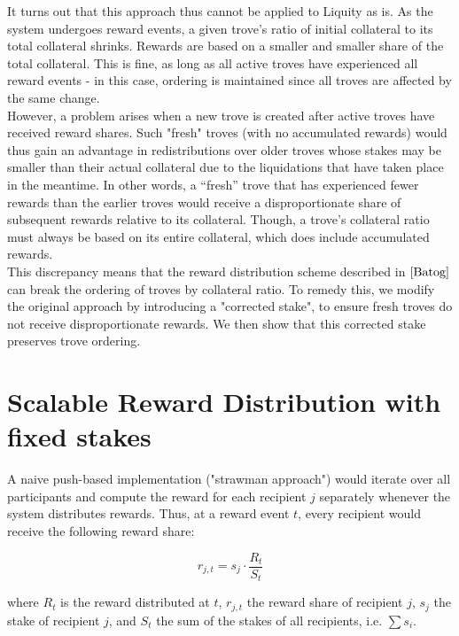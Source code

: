 \documentclass[reqno]{article}
\begin{document}
It turns out that this approach thus cannot be applied to Liquity as is. As the system undergoes reward events, a given trove’s ratio of initial collateral to its total collateral shrinks. Rewards are based on a smaller and smaller share of the total collateral. This is fine, as long as all active troves have experienced all reward events - in this case, ordering is maintained since all troves are affected by the same change. \\

However, a problem arises when a new trove is created after active troves have received reward shares.  Such "fresh" troves (with no accumulated rewards) would thus gain an advantage in redistributions over older troves whose stakes may be smaller than their actual collateral due to the liquidations that have taken place in the meantime. In other words, a “fresh” trove that has experienced fewer rewards than the earlier troves would receive a disproportionate share of subsequent rewards relative to its collateral. Though, a trove's collateral ratio must always be based on its entire collateral, which does include accumulated rewards.  \\

This discrepancy means that the reward distribution scheme described in $\cite{Batog}$ can break the ordering of troves by collateral ratio. To remedy this, we modify the original approach by introducing a "corrected stake", to ensure fresh troves do not receive disproportionate rewards. We then show that this corrected stake preserves trove ordering. \\


\section{Scalable Reward Distribution with fixed stakes}
A naive push-based implementation ("strawman approach") would iterate over all participants and compute the reward for each recipient $j$ separately whenever the system distributes rewards. Thus, at a reward event $t$, every recipient would receive the following reward share:

\begin{equation} 
    r_{j,t}=s_j \cdot \frac{R_t}{S_t}
\end{equation}

where $R_t$ is the reward distributed at $t$, $r_{j,t}$ the reward share of recipient $j$, $s_j$ the stake of recipient $j$, and $S_t$ the sum of the stakes of all recipients, i.e. $\sum s_i$.
\end{document}
